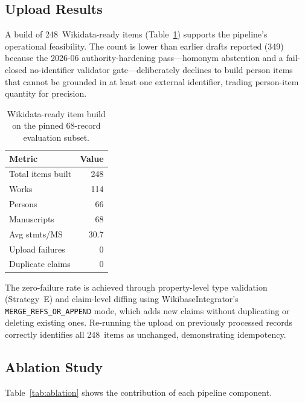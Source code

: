 \documentclass[Afour,sageh,times]{sagej}
\begin{document}
\subsection{Upload Results}

A build of 248~Wikidata-ready items (Table~\ref{tab:upload}) supports the pipeline's operational feasibility. The count is lower than earlier drafts reported (349) because the 2026-06 authority-hardening pass---homonym abstention and a fail-closed no-identifier validator gate---deliberately declines to build person items that cannot be grounded in at least one external identifier, trading person-item quantity for precision.

\begin{table}[t]
\caption{Wikidata-ready item build on the pinned 68-record evaluation subset.}
\label{tab:upload}
\centering
\small
\begin{tabular}{lr}
\toprule
\textbf{Metric} & \textbf{Value} \\
\midrule
Total items built      & 248 \\
\quad Works            & 114 \\
\quad Persons          & 66 \\
\quad Manuscripts      & 68 \\
Avg stmts/MS           & 30.7 \\
Upload failures        & 0 \\
Duplicate claims       & 0   \\
\bottomrule
\end{tabular}
\end{table}

The zero-failure rate is achieved through property-level type validation (Strategy~E) and claim-level diffing using WikibaseIntegrator's \texttt{MERGE\_REFS\_OR\_APPEND} mode, which adds new claims without duplicating or deleting existing ones. Re-running the upload on previously processed records correctly identifies all 248~items as unchanged, demonstrating idempotency.

\subsection{Ablation Study}

Table~\ref{tab:ablation} shows the contribution of each pipeline component.
\end{document}
